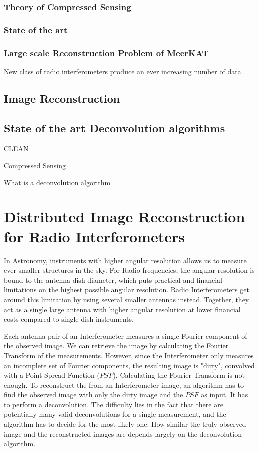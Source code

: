 \subsubsection{Theory of Compressed Sensing}

\subsubsection{State of the art}

\subsubsection{Large scale Reconstruction Problem of MeerKAT}
New class of radio interferometers produce an ever increasing number of data.





\subsection{Image Reconstruction}

\subsection{State of the art Deconvolution algorithms}

CLEAN

Compressed Sensing

What is a deconvolution algorithm

\pagebreak
\section{Distributed Image Reconstruction for Radio Interferometers}
In Astronomy, instruments with higher angular resolution allows us to measure ever smaller structures in the sky. For Radio frequencies, the angular resolution is bound to the antenna dish diameter, which puts practical and financial limitations on the highest possible angular resolution. Radio Interferometers get around this limitation by using several smaller antennas instead. Together, they act as a single large antenna with higher angular resolution at lower financial costs compared to single dish instruments.

Each antenna pair of an Interferometer measures a single Fourier component of the observed image. We can retrieve the image by calculating the Fourier Transform of the measurements. However, since the Interferometer only measures an incomplete set of Fourier components, the resulting image is "dirty", convolved with a Point Spread Function ($PSF$). Calculating the Fourier Transform is not enough. To reconstruct the from an Interferometer image, an algorithm has to find the observed image with only the dirty image and the $PSF$ as input. It has to perform a deconvolution. The difficulty lies in the fact that there are potentially many valid deconvolutions for a single measurement, and the algorithm has to decide for the most likely one. How similar the truly observed image and the reconstructed images are depends largely on the deconvolution algorithm.

